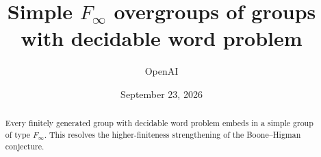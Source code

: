 \documentclass[11pt]{article}
\title{Simple \texorpdfstring{$F_\infty$}{F-infinity} overgroups of groups\\
with decidable word problem}
\author{OpenAI}
\date{September 23, 2026}
\numberwithin{equation}{section}
\theoremstyle{definition}
\theoremstyle{remark}
\begin{document}
\maketitle
\begin{abstract}
Every finitely generated group with decidable word problem embeds in a
simple group of type \(F_\infty\). This resolves the higher-finiteness
strengthening of the Boone--Higman conjecture.
\end{abstract}
\begingroup
\small
\tableofcontents
\endgroup
\clearpage







\end{document}
